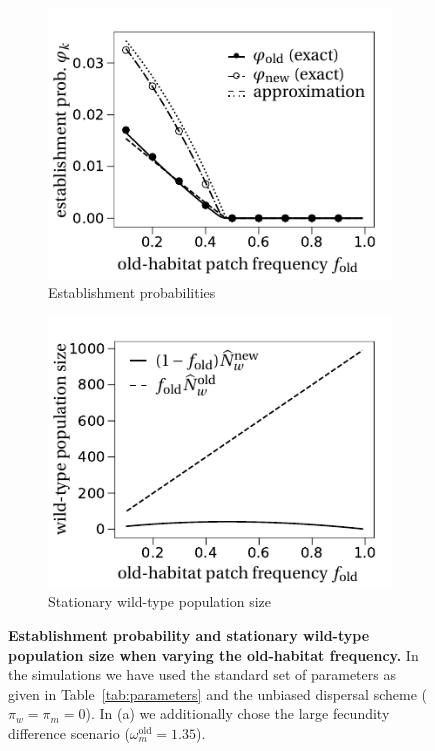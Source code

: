 \documentclass[11pt]{article}
\begin{document}
\begin{figure}[h!]
	\centering
	\begin{subfigure}{.5\textwidth}
		\centering
		\includegraphics[width=\linewidth]{figS3a.pdf}
		\caption{Establishment probabilities}
	\end{subfigure}%
	\begin{subfigure}{.5\textwidth}
		\centering
		\includegraphics[width=\linewidth]{figS3b.pdf}
		\caption{Stationary wild-type population size}
	\end{subfigure}
	\caption{\textbf{Establishment probability and stationary wild-type population size when varying the old-habitat frequency.} In the simulations we have used the standard set of parameters as given in Table~\ref{tab:parameters} and the unbiased dispersal scheme ($\pi_w=\pi_m=0$). In (a) we additionally chose the large fecundity difference scenario ($\omega^\text{old}_m=1.35$).}
	\label{Sfig:vary_f_origin}
\end{figure}
\end{document}
